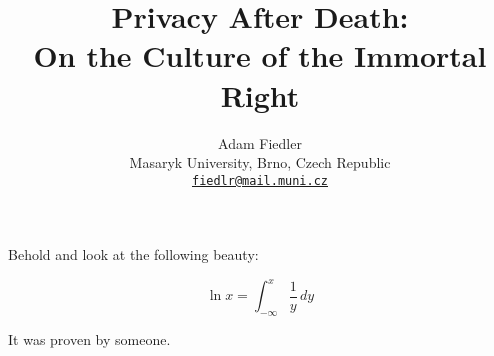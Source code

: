 \documentclass[a4paper]{article}
\title{
    Privacy After Death:\\
    On the Culture of the Immortal Right
}
\author{
    Adam Fiedler\\
    \small
    Masaryk University, Brno, Czech Republic\\
    \small
    \texttt{\href{mailto:fiedlr@mail.muni.cz}{fiedlr@mail.muni.cz}}
}
\date{}
\begin{document}
\maketitle

Behold and look at the following beauty:

$$ \ln x = \int_{-\infty}^x \frac 1 y \, dy  $$

It was proven by someone\cite{someone}.
\end{document}
